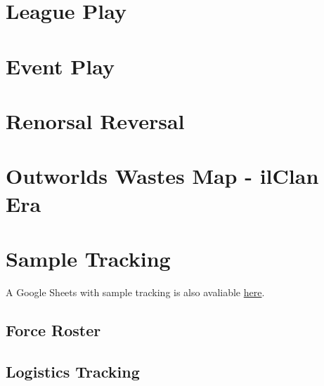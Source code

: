 \documentclass{article}
\newcommand{\mysectiontitle}{}
\newcommand{\newsection}[2]{\renewcommand{\mysectiontitle}{#2}\section{#1}}
\begin{document}


\newpage

\newsection{League Play}{league-play}
\label{sec:league_play}



\newpage

\newsection{Event Play}{event-play}
\label{sec:event_play}



\newpage

\newsection{Renorsal Reversal}{short-story}



\newpage

\newsection{Outworlds Wastes Map - ilClan Era}{outworlds-wastes-map}
\label{sec:outworlds_wastes_map}



\newpage

\newsection{Sample Tracking}{sample-tracking}
\label{sec:sample_tracking}

A Google Sheets with sample tracking is also avaliable \href{https://docs.google.com/spreadsheets/d/1uGSthgyHZNMcxrVl6FJjIguesnTC9MTuP-9ow939Quw/copy}{here}.

\subsection{Force Roster}



\subsection{Logistics Tracking}
\end{document}

